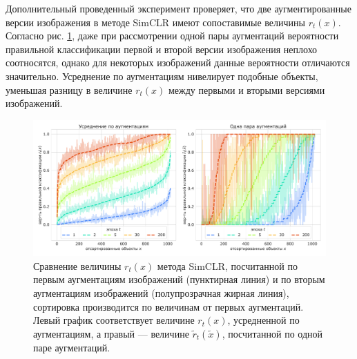 Дополнительный проведенный эксперимент проверяет, что две аугментированные версии изображения в методе SimCLR имеют сопоставимые величины $r_t(x)$. Согласно рис. \ref{appendix:pic:2}, даже при рассмотрении одной пары аугментаций вероятности правильной классификации первой и второй версии изображения неплохо соотносятся, однако для некоторых изображений данные вероятности отличаются значительно. Усреднение по аугментациям нивелирует подобные объекты, уменьшая разницу в величине $r_t(x)$ между первыми и вторыми версиями изображений.

\begin{figure}[H]
    \centering
    \renewcommand{\thefigure}{Б.1}
    \includegraphics[width=17cm]{images/first_second.pdf}
    \caption{Сравнение величины $r_t(x)$ метода SimCLR, посчитанной по первым аугментациям изображений (пунктирная линия) и по вторым аугментациям изображений (полупрозрачная жирная линия), сортировка производится по величинам от первых аугментаций. Левый график соответствует величине $r_t(x)$, усредненной по аугментациям, а правый --- величине $\tilde{r}_t(\tilde{x})$, посчитанной по одной паре аугментаций.}
    \label{appendix:pic:2}
\end{figure}{}

